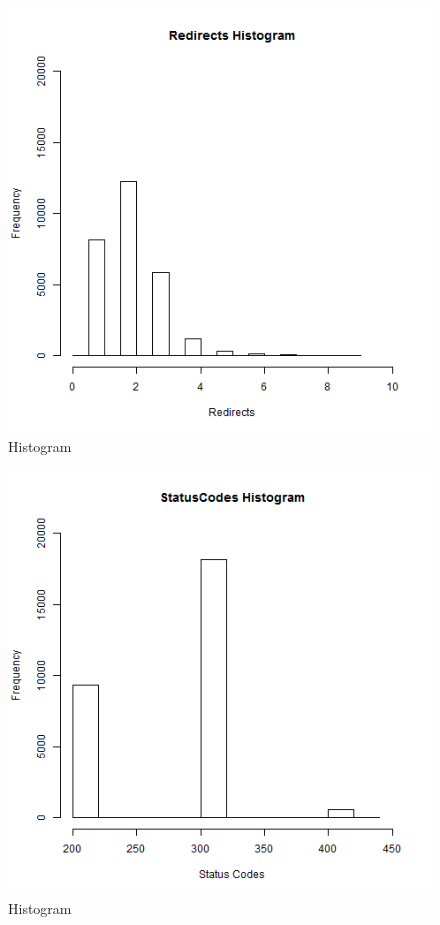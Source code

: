\begin{figure}[ht]    
    \begin{center}
        \includegraphics[scale=0.60]{Redirecthistogram.png}
        \caption{Histogram}
        \label{RedirectHistogram}
    \end{center}
\end{figure}

\begin{figure}[ht]    
    \begin{center}
        \includegraphics[scale=0.60]{StatusCodeshistogram.png}
        \caption{Histogram}
        \label{StatusCodesHistogram}
    \end{center}
\end{figure}